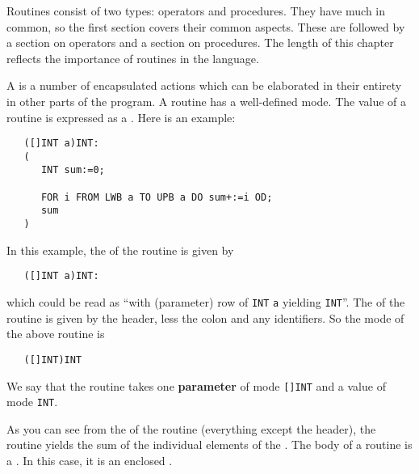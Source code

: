 %
%
%
Routines consist of two types: operators and procedures. They have
much in common, so the first section covers their common aspects.
These are followed by a section on operators and a section on
procedures. The length of this chapter reflects the importance of
routines in the language.

A  is a number of encapsulated actions
which can be elaborated in their entirety in other parts of the
program. A routine has a well-defined mode. The value of a routine is
expressed as a .
Here is an example:
\begin{verbatim}
   ([]INT a)INT:
   (
      INT sum:=0;
   
      FOR i FROM LWB a TO UPB a DO sum+:=i OD;
      sum
   )
\end{verbatim}
\noindent
In this example, the of the
routine is given by
\begin{verbatim}
   ([]INT a)INT:
\end{verbatim}
\noindent
which could be read as ``with (parameter) row of \verb|INT| \verb|a|
yielding \verb|INT|''.  The  of the routine is
given by the header, less the colon and any identifiers. So the mode
of the above routine is
\begin{verbatim}
   ([]INT)INT
\end{verbatim}
\noindent
We say that the routine takes one \textbf{parameter} of mode
\verb|[]INT| and  a value of mode
\verb|INT|.

As you can see from the  of the
routine (everything except the header), the routine yields the sum of
the individual elements of the .  The body of a routine
is a . In this case, it is an enclosed
.

